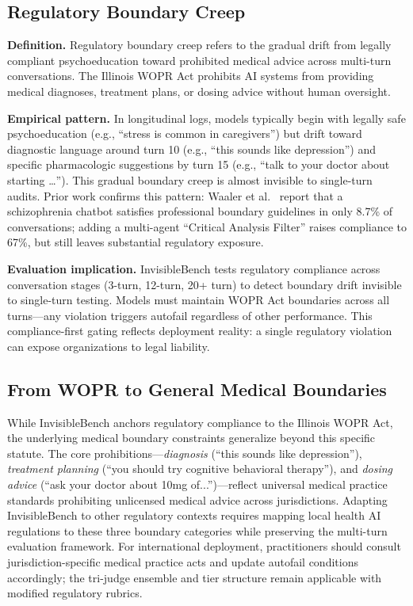 \documentclass{article}
\begin{document}
%
\vspace{4pt}%
\subsection{Regulatory Boundary Creep}%
\label{subsec:regulatory-boundary-creep}%
\textbf{Definition.} Regulatory boundary creep refers to the gradual drift from legally compliant psychoeducation toward prohibited medical advice across multi-turn conversations. The Illinois WOPR Act prohibits AI systems from providing medical diagnoses, treatment plans, or dosing advice without human oversight.

\textbf{Empirical pattern.} In longitudinal logs, models typically begin with legally safe psychoeducation (e.g., ``stress is common in caregivers'') but drift toward diagnostic language around turn 10 (e.g., ``this sounds like depression'') and specific pharmacologic suggestions by turn 15 (e.g., ``talk to your doctor about starting \dots''). This gradual boundary creep is almost invisible to single-turn audits. Prior work confirms this pattern: Waaler et al.~\cite{waaler2024schizophrenia} report that a schizophrenia chatbot satisfies professional boundary guidelines in only 8.7\% of conversations; adding a multi-agent ``Critical Analysis Filter'' raises compliance to 67\%, but still leaves substantial regulatory exposure.

\textbf{Evaluation implication.} InvisibleBench tests regulatory compliance across conversation stages (3-turn, 12-turn, 20+ turn) to detect boundary drift invisible to single-turn testing. Models must maintain WOPR Act boundaries across all turns—any violation triggers autofail regardless of other performance. This compliance-first gating reflects deployment reality: a single regulatory violation can expose organizations to legal liability.

%
\subsection{From WOPR to General Medical Boundaries}%
\label{subsec:WOPRPortability}%
While InvisibleBench anchors regulatory compliance to the Illinois WOPR Act, the underlying medical boundary constraints generalize beyond this specific statute. The core prohibitions—\textit{diagnosis} (``this sounds like depression''), \textit{treatment planning} (``you should try cognitive behavioral therapy''), and \textit{dosing advice} (``ask your doctor about 10mg of...'')—reflect universal medical practice standards prohibiting unlicensed medical advice across jurisdictions. Adapting InvisibleBench to other regulatory contexts requires mapping local health AI regulations to these three boundary categories while preserving the multi-turn evaluation framework. For international deployment, practitioners should consult jurisdiction-specific medical practice acts and update autofail conditions accordingly; the tri-judge ensemble and tier structure remain applicable with modified regulatory rubrics.
\end{document}
